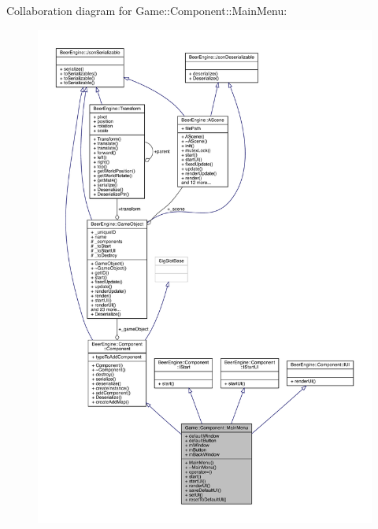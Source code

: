 Collaboration diagram for Game\+:\+:Component\+:\+:Main\+Menu\+:
\nopagebreak
\begin{figure}[H]
\begin{center}
\leavevmode
\includegraphics[width=350pt]{class_game_1_1_component_1_1_main_menu__coll__graph}
\end{center}
\end{figure}
